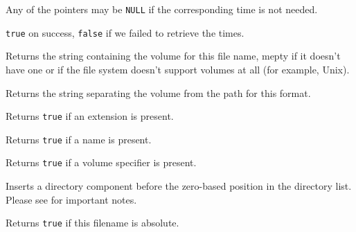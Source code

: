 Any of the pointers may be {\tt NULL} if the corresponding time is not
needed.


{\tt true} on success, {\tt false} if we failed to retrieve the times.


\label{wxfilenamegetvolume}


Returns the string containing the volume for this file name, mepty if it
doesn't have one or if the file system doesn't support volumes at all (for
example, Unix).


\label{wxfilenamegetvolumeseparator}


Returns the string separating the volume from the path for this format.


\label{wxfilenamehasext}


Returns {\tt true} if an extension is present.


\label{wxfilenamehasname}


Returns {\tt true} if a name is present.


\label{wxfilenamehasvolume}


Returns {\tt true} if a volume specifier is present.


\label{wxfilenameinsertdir}


Inserts a directory component before the zero-based position in the directory
list. Please see  for important notes.


\label{wxfilenameisabsolute}


Returns {\tt true} if this filename is absolute.


\label{wxfilenameiscasesensitive}

